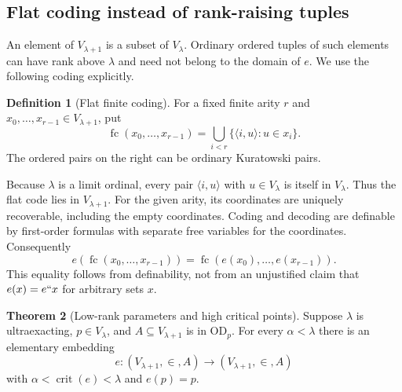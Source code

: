 \documentclass[11pt,letterpaper]{article}
\theoremstyle{definition}
\newtheorem{definition}{Definition}[section]
\newtheorem{theorem}[definition]{Theorem}
\numberwithin{equation}{section}
\newcommand{\OD}{\mathrm{OD}}
\newcommand{\crit}{\operatorname{crit}}
\newcommand{\fc}{\operatorname{fc}}
\begin{document}
\subsection{Flat coding instead of rank-raising tuples}

An element of $V_{\lambda+1}$ is a subset of $V_\lambda$. Ordinary ordered tuples of such elements can have rank above $\lambda$ and need not belong to the domain of $e$. We use the following coding explicitly.

\begin{definition}[Flat finite coding]\label{def:flat}
For a fixed finite arity $r$ and $x_0,\ldots,x_{r-1}\in V_{\lambda+1}$, put
\[
 \fc(x_0,\ldots,x_{r-1})
   =\bigcup_{i<r}\{\langle i,u\rangle:u\in x_i\}.
\]
The ordered pairs on the right can be ordinary Kuratowski pairs.
\end{definition}

Because $\lambda$ is a limit ordinal, every pair $\langle i,u\rangle$ with $u\in V_\lambda$ is itself in $V_\lambda$. Thus the flat code lies in $V_{\lambda+1}$. For the given arity, its coordinates are uniquely recoverable, including the empty coordinates. Coding and decoding are definable by first-order formulas with separate free variables for the coordinates. Consequently
\begin{equation}\label{eq:flatnatural}
 e(\fc(x_0,\ldots,x_{r-1}))
      =\fc(e(x_0),\ldots,e(x_{r-1})).
\end{equation}
This equality follows from definability, not from an unjustified claim that $e(x)=e``x$ for arbitrary sets $x$.

\begin{theorem}[Low-rank parameters and high critical points]\label{thm:interface}
Suppose $\lambda$ is ultraexacting, $p\in V_\lambda$, and $A\subseteq V_{\lambda+1}$ is in $\OD_p$. For every $\alpha<\lambda$ there is an elementary embedding
\[
 e:(V_{\lambda+1},\in,A)\longrightarrow(V_{\lambda+1},\in,A)
\]
with $\alpha<\crit(e)<\lambda$ and $e(p)=p$.
\end{theorem}
\end{document}

